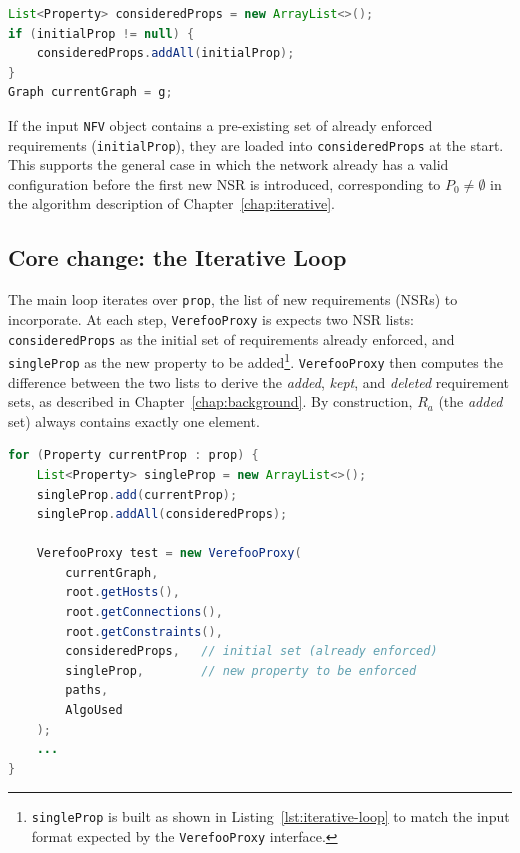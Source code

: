 \begin{lstlisting}[language=Java, caption={Initialization of the iterative state.}, label={lst:iterative-state-init}]
List<Property> consideredProps = new ArrayList<>();
if (initialProp != null) {
    consideredProps.addAll(initialProp);
}
Graph currentGraph = g;
\end{lstlisting}

If the input \texttt{NFV} object contains a pre-existing set of already enforced requirements (\texttt{initialProp}), they are loaded into \texttt{consideredProps} at the start. This supports the general case in which the network already has a valid configuration before the first new NSR is introduced, corresponding to $P_0 \neq \emptyset$ in the algorithm description of Chapter~\ref{chap:iterative}.

\subsection{Core change:  the Iterative Loop}



The main loop iterates over \texttt{prop}, the list of new requirements (NSRs) to incorporate. At each step, \texttt{VerefooProxy} is expects two NSR lists: \texttt{consideredProps} as the initial set of requirements already enforced, and \texttt{singleProp} as the new property to be added\footnote{\texttt{singleProp} is built as shown in Listing~\ref{lst:iterative-loop} to match the input format expected by the \texttt{VerefooProxy} interface.}. \texttt{VerefooProxy} then computes the difference between the two lists to derive the \textit{added}, \textit{kept}, and \textit{deleted} requirement sets, as described in Chapter~\ref{chap:background}. By construction, $R_a$ (the \textit{added} set) always contains exactly one element.

\begin{lstlisting}[language=Java, caption={Core of the iterative loop.}, label={lst:iterative-loop}]
for (Property currentProp : prop) {
    List<Property> singleProp = new ArrayList<>();
    singleProp.add(currentProp);
    singleProp.addAll(consideredProps);

    VerefooProxy test = new VerefooProxy(
        currentGraph,
        root.getHosts(),
        root.getConnections(),
        root.getConstraints(),
        consideredProps,   // initial set (already enforced)
        singleProp,        // new property to be enforced
        paths,
        AlgoUsed
    );
    ...
}
\end{lstlisting}

